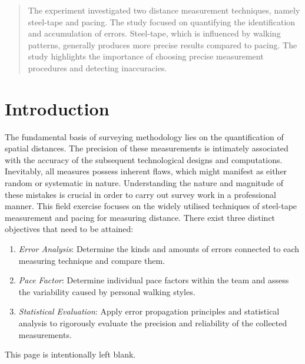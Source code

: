\documentclass[12pt]{article}
\begin{document}
\clearpage




\thispagestyle{fancy}
\pagestyle{fancy}
\tableofcontents
\newpage
\begin{abstract}
The experiment investigated two distance measurement techniques, namely steel-tape and pacing. The study focused on quantifying the identification and accumulation of errors. Steel-tape, which is influenced by walking patterns, generally produces more precise results compared to pacing. The study highlights the importance of choosing precise measurement procedures and detecting inaccuracies.
\end{abstract}

\section*{Introduction}

The fundamental basis of surveying methodology lies on the quantification of spatial distances. The precision of these measurements is intimately associated with the accuracy of the subsequent technological designs and computations. Inevitably, all measures possess inherent flaws, which might manifest as either random or systematic in nature. Understanding the nature and magnitude of these mistakes is crucial in order to carry out survey work in a professional manner. This field exercise focuses on the widely utilised techniques of steel-tape measurement and pacing for measuring distance.  There exist three distinct objectives that need to be attained:

\begin{enumerate}
\item \textit{Error Analysis}: Determine the kinds and amounts of errors connected to each measuring technique and compare them.

\item \textit{Pace Factor}: Determine individual pace factors within the team and assess the variability caused by personal walking styles.

\item \textit{Statistical Evaluation}: Apply error propagation principles and statistical analysis to rigorously evaluate the precision and reliability of the collected measurements. 
\end{enumerate}
\newpage
\vspace*{\fill}
\begin{center}
    This page is intentionally left blank.
\end{center}
\vspace{\fill}
\end{document}
